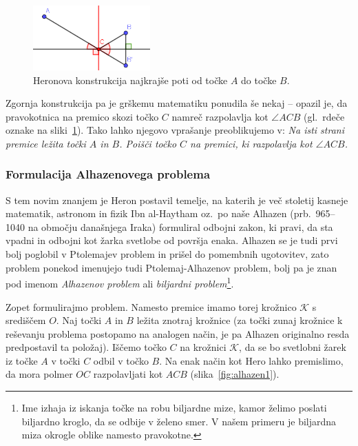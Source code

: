 \begin{figure}[h]
    \centering
    \includegraphics[width=0.4\textwidth]{images/alhazen/heron.png}
    \caption[Heronovo vprašanje]{Heronova konstrukcija najkrajše poti od točke $A$ do točke $B$.}
    \label{fig:heron}
\end{figure}

Zgornja konstrukcija pa je grškemu matematiku ponudila še nekaj -- opazil je, da pravokotnica na premico skozi točko $C$ namreč razpolavlja kot $\angle ACB$ (gl.\ rdeče oznake na sliki~\ref{fig:heron}). Tako lahko njegovo vprašanje preoblikujemo v: \emph{Na isti strani premice ležita točki $A$ in $B$. Poišči točko $C$ na premici, ki razpolavlja kot $\angle ACB$.}


\subsubsection*{Formulacija Alhazenovega problema}

S tem novim znanjem je Heron postavil temelje, na katerih je več stoletij kasneje matematik, astronom in fizik Ibn al-Haytham oz.\ po naše Alhazen (prb.\ 965--1040 na območju današnjega Iraka) formuliral odbojni zakon, ki pravi, da sta vpadni in odbojni kot žarka svetlobe od površja enaka. Alhazen se je tudi prvi bolj poglobil v Ptolemajev problem in prišel do pomembnih ugotovitev, zato problem ponekod imenujejo tudi Ptolemaj-Alhazenov problem, bolj pa je znan pod imenom \emph{Alhazenov problem} ali \emph{biljardni problem}\footnote{Ime izhaja iz iskanja točke na robu biljardne mize, kamor želimo poslati biljardno kroglo, da se odbije v želeno smer. V našem primeru je biljardna miza okrogle oblike namesto pravokotne.}. 

Zopet formulirajmo problem. Namesto premice imamo torej krožnico $\mathcal{K}$ s središčem $O$. Naj točki $A$ in $B$ ležita znotraj krožnice (za točki zunaj krožnice k reševanju problema postopamo na analogen način, je pa Alhazen originalno resda predpostavil ta položaj). Iščemo točko $C$ na krožnici $\mathcal{K}$, da se bo svetlobni žarek iz točke $A$ v točki $C$ odbil v točko $B$. Na enak način kot Hero lahko premislimo, da mora polmer $OC$ razpolavljati kot $ACB$ (slika~\ref{fig:alhazen1}).

